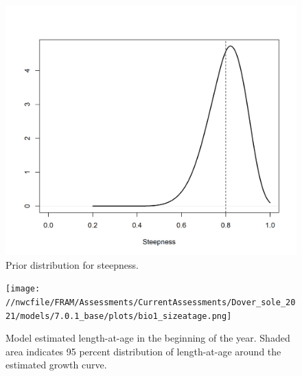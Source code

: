 \documentclass[11pt,
  english,
  a4paper,
]{article}
\begin{document}

\begin{figure}
\centering
\includegraphics[width=1\textwidth,height=1\textheight]{figs/h_prior.png}
\caption{Prior distribution for steepness.\label{fig:h-prior}}
\end{figure}

\tagmcend\tagstructend


\begin{figure}
\centering
\texttt{[image: //nwcfile/FRAM/Assessments/CurrentAssessments/Dover\_sole\_2021/models/7.0.1\_base/plots/bio1\_sizeatage.png]}
\caption{Model estimated length-at-age in the beginning of the year. Shaded area indicates 95 percent distribution of length-at-age around the estimated growth curve.\label{fig:mod-est-len-age}}
\end{figure}

\tagmcend\tagstructend

\end{document}
